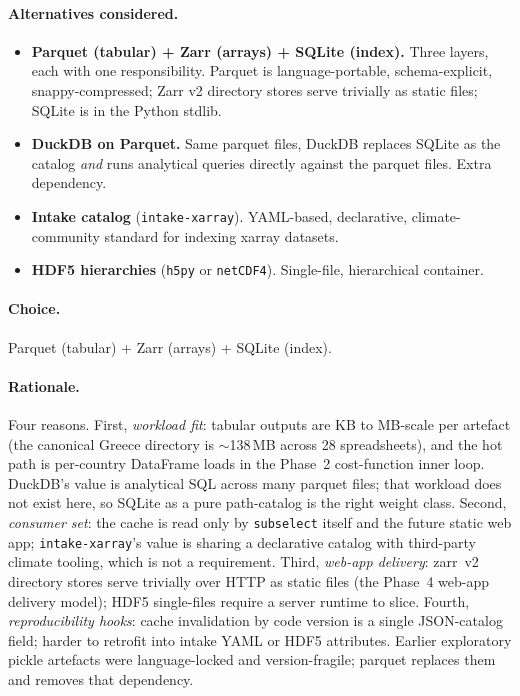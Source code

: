 \documentclass[11pt,a4paper]{article}
\begin{document}
\paragraph{Alternatives considered.}
\begin{itemize}
  \item \textbf{Parquet (tabular) + Zarr (arrays) + SQLite (index).}
        Three layers, each with one responsibility. Parquet is language-portable,
        schema-explicit, snappy-compressed; Zarr v2 directory stores serve
        trivially as static files; SQLite is in the Python stdlib.
  \item \textbf{DuckDB on Parquet.} Same parquet files, DuckDB replaces SQLite
        as the catalog \emph{and} runs analytical queries directly against
        the parquet files. Extra dependency.
  \item \textbf{Intake catalog} (\texttt{intake-xarray}). YAML-based,
        declarative, climate-community standard for indexing xarray datasets.
  \item \textbf{HDF5 hierarchies} (\texttt{h5py} or \texttt{netCDF4}).
        Single-file, hierarchical container.
\end{itemize}

\paragraph{Choice.} Parquet (tabular) + Zarr (arrays) + SQLite (index).

\paragraph{Rationale.} Four reasons. First, \emph{workload fit}: tabular
outputs are KB to MB-scale per artefact (the canonical Greece directory is
$\sim$138\,MB across 28 spreadsheets), and the hot path is per-country
DataFrame loads in the Phase~2 cost-function inner loop. DuckDB's value is
analytical SQL across many parquet files; that workload does not exist
here, so SQLite as a pure path-catalog is the right weight class. Second,
\emph{consumer set}: the cache is read only by \texttt{subselect} itself and
the future static web app; \texttt{intake-xarray}'s value is sharing a
declarative catalog with third-party climate tooling, which is not a
requirement. Third, \emph{web-app delivery}: zarr~v2 directory stores serve
trivially over HTTP as static files (the Phase~4 web-app delivery model);
HDF5 single-files require a server runtime to slice. Fourth,
\emph{reproducibility hooks}: cache invalidation by code version is a
single JSON-catalog field; harder to retrofit into intake YAML or HDF5
attributes. Earlier exploratory pickle artefacts were language-locked
and version-fragile; parquet replaces them and removes that dependency.
\end{document}
